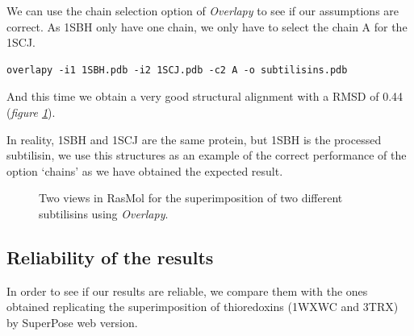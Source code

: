 \documentclass{article}
\begin{document}
We can use the chain selection option of \textit{Overlapy} to see if our assumptions are correct. As 1SBH only have one chain, we only have to select the chain A for the 1SCJ.

\begin{lstlisting}
overlapy -i1 1SBH.pdb -i2 1SCJ.pdb -c2 A -o subtilisins.pdb
\end{lstlisting}

And this time we obtain a very good structural alignment with a RMSD of 0.44 (\textit{figure \ref{fig:subtis}}).

In reality, 1SBH and 1SCJ are the same protein, but 1SBH is the processed subtilisin, we use this structures as an example of the correct performance of the option `chains' as we have obtained the expected result.

\begin{figure}[h]
	\centering
	\caption{Two views in RasMol for the superimposition of two different subtilisins using \textit{Overlapy}.}
	\label{fig:subtis}
\end{figure}

\subsection*{\color{gray}Reliability of the results}
In order to see if our results are reliable, we compare them with the ones obtained replicating the superimposition of thioredoxins (1WXWC and 3TRX) by SuperPose web version\cite{22}.
\end{document}
